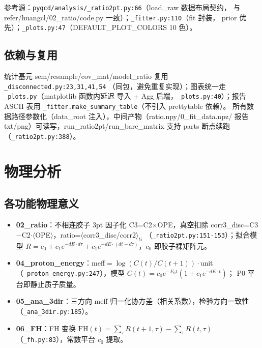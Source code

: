 \documentclass[11pt]{article}
\begin{document}
参考源：\texttt{pyqcd/analysis/\_ratio2pt.py:66}（load\_raw 数据布局契约，
与 refer/huangcl/02\_ratio/code.py 一致）；\texttt{\_fitter.py:110}（fit 封装，
prior 优先）；\texttt{\_plots.py:47}（DEFAULT\_PLOT\_COLORS 10 色）。

\subsection{依赖与复用}
统计基元 sem/resample/cov\_mat/model\_ratio 复用 \texttt{\_disconnected.py:23,31,41,54}
（同包，避免重复实现）；图表统一走 \texttt{\_plots.py}（matplotlib 函数内延迟
导入 + Agg 后端，\texttt{\_plots.py:40}）；报告 ASCII 表用
\texttt{\_fitter.make\_summary\_table}（不引入 prettytable 依赖）。
所有数据路径参数化（data\_root 注入），中间产物（ratio.npy/0\_fit\_data.npz/
报告 txt/png）可读写，run\_ratio2pt/run\_bare\_matrix 支持 parts 断点续跑
（\texttt{\_ratio2pt.py:388}）。

\section{物理分析}
\subsection{各功能物理意义}
\begin{itemize}
\item \textbf{02\_ratio}：不相连胶子 3pt 因子化 C3=C2$\times$OPE，真空扣除
corr3\_disc=C3$-$C2$\cdot\langle$OPE$\rangle$，ratio=$\langle$corr3\_disc/corr2$\rangle_{ti}$
（\texttt{\_ratio2pt.py:151-153}）；拟合模型
$R=c_0+c_1 e^{-dE\cdot d\tau}+c_1 e^{-dE\cdot(dt-d\tau)}$，$c_0$ 即胶子裸矩阵元。
\item \textbf{04\_proton\_energy}：meff$=\log(C(t)/C(t+1))\cdot$unit
（\texttt{\_proton\_energy.py:247}），模型 $C(t)=c_0 e^{-E_0 t}(1+c_1 e^{-dE\cdot t})$；
P0 平台即静止质子质量。
\item \textbf{05\_ana\_3dir}：三方向 meff 归一化协方差（相关系数），检验方向一致性
（\texttt{\_ana\_3dir.py:185}）。
\item \textbf{06\_FH}：FH 变换 $\mathrm{FH}(t)=\sum_{\tau}R(t+1,\tau)-\sum_{\tau}R(t,\tau)$
（\texttt{\_fh.py:83}），常数平台 $c_0$ 提取。
\end{itemize}
\end{document}
